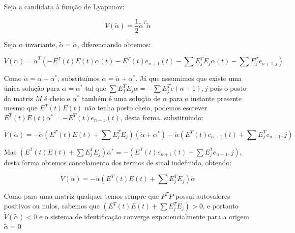 \documentclass[11pt]{report}
\begin{document}
Seja a candidata à função de Lyapunov:

\begin{equation}
V(\tilde{\alpha}) = \frac{1}{2}\tilde{\alpha}^T\tilde{\alpha} 
\end{equation}

Seja $\alpha$ invariante, $\dot{\tilde{\alpha}} = \dot{\alpha}$, diferenciando obtemos:

\begin{equation}
\dot{V}(\tilde{\alpha}) = \tilde{\alpha}^T(-E^T(t)E(t)\alpha(t) - E^T(t)e_{n+1}(t) -\sum E_j^TE_j\alpha(t) -\sum E_j^Te_{n+1,j})
\end{equation}

Como $\tilde{\alpha} = \alpha - \alpha^*$, substituímos $\alpha = \tilde{\alpha} + \alpha^*$. Já que assumimos que existe uma única solução para $\alpha=\alpha^*$ tal que $\sum E^T_jE_j \alpha = -\sum E^T_je(n+1),j$ pois o posto da matriz $M$ é cheio e $\alpha^*$ também é uma solução de $\alpha$ para o instante presente mesmo que $E^T(t)E(t)$ não tenha posto cheio, podemos escrever $E^T(t)E(t)\alpha^* = -E^T(t)e_{n+1}(t)$, desta forma, substituindo:

\begin{equation}
\dot{V}(\tilde{\alpha}) = -\tilde{\alpha}(E^T(t)E(t)+\sum E_j^TE_j)(\tilde{\alpha}+\alpha^*) - \tilde{\alpha}(E^T(t)e_{n+1}(t) + \sum E_j^Te_{n+1},j)
\end{equation}

Mas $(E^T(t)E(t)+\sum E_j^TE_j)\alpha^* = -(E^T(t)e_{n+1}(t) + \sum E_j^Te_{n+1},j)$, desta forma obtemos cancelamento dos termos de sinal indefinido, obtendo:

\begin{equation}
\dot{V}(\tilde{\alpha}) = -\tilde{\alpha}(E^T(t)E(t)+\sum E_j^TE_j)\tilde{\alpha}
\end{equation}

Como para uma matriz qualquer temos sempre que $P^TP$ possui autovalores positivos ou nulos, sabemos que $(E^T(t)E(t)+\sum E_j^TE_j)>0$, e portanto $\dot{V}(\tilde{\alpha})<0$ e o sistema de identificação converge exponencialmente para a origem $\tilde{\alpha} = 0$
 
\end{document}
